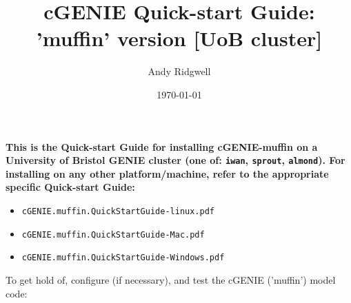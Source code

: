 \documentclass[10pt,twoside]{article}
\title{cGENIE Quick-start Guide: 'muffin' version [UoB cluster]}
\author{Andy Ridgwell}
\date{\today}
\begin{document}

\maketitle


\noindent \textbf{This is the Quick-start Guide for installing cGENIE-muffin on a University of Bristol GENIE cluster (one of: \texttt{iwan}, \texttt{sprout}, \texttt{almond}). For installing on any other platform/machine, refer to the appropriate specific Quick-start Guide:}
\vspace{-10pt}
\begin{itemize}[noitemsep]
\item[] \texttt{cGENIE.muffin.QuickStartGuide-linux.pdf}
\item[] \texttt{cGENIE.muffin.QuickStartGuide-Mac.pdf}
\item[] \texttt{cGENIE.muffin.QuickStartGuide-Windows.pdf}
\end{itemize}

\noindent To get hold of, configure (if necessary), and test the cGENIE ('muffin') model code:
\end{document}
